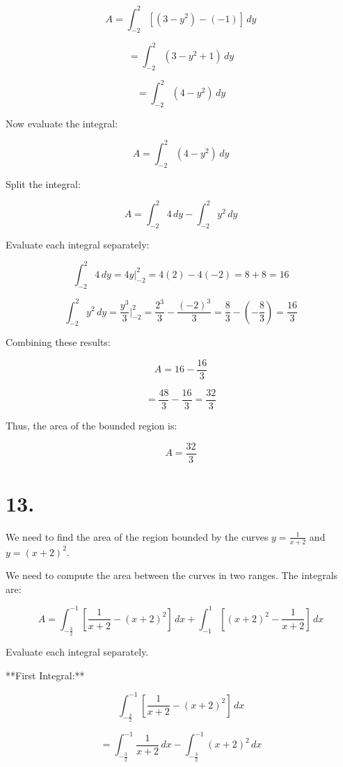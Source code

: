 \documentclass{article}
\begin{document}
\[
A = \int_{-2}^{2} \left[ (3 - y^2) - (-1) \right] \, dy
\]

\[
= \int_{-2}^{2} \left( 3 - y^2 + 1 \right) \, dy
\]

\[
= \int_{-2}^{2} \left( 4 - y^2 \right) \, dy
\]



Now evaluate the integral:

\[
A = \int_{-2}^{2} \left( 4 - y^2 \right) \, dy
\]

Split the integral:

\[
A = \int_{-2}^{2} 4 \, dy - \int_{-2}^{2} y^2 \, dy
\]

Evaluate each integral separately:

\[
\int_{-2}^{2} 4 \, dy = 4y \Big|_{-2}^{2} = 4(2) - 4(-2) = 8 + 8 = 16
\]

\[
\int_{-2}^{2} y^2 \, dy = \frac{y^3}{3} \Big|_{-2}^{2} = \frac{2^3}{3} - \frac{(-2)^3}{3} = \frac{8}{3} - \left(-\frac{8}{3}\right) = \frac{16}{3}
\]

Combining these results:

\[
A = 16 - \frac{16}{3}
\]

\[
= \frac{48}{3} - \frac{16}{3} = \frac{32}{3}
\]

Thus, the area of the bounded region is:

\[
A = \frac{32}{3}
\]

\section*{13.}

We need to find the area of the region bounded by the curves \( y = \frac{1}{x + 2} \) and \( y = (x + 2)^2 \). 





We need to compute the area between the curves in two ranges. The integrals are:

\[
A = \int_{-\frac{3}{2}}^{-1} \left[ \frac{1}{x + 2} - (x + 2)^2 \right] \, dx + \int_{-1}^{1} \left[ (x + 2)^2 - \frac{1}{x + 2} \right] \, dx
\]



Evaluate each integral separately.

**First Integral:**

\[
\int_{-\frac{3}{2}}^{-1} \left[ \frac{1}{x + 2} - (x + 2)^2 \right] \, dx
\]

\[
= \int_{-\frac{3}{2}}^{-1} \frac{1}{x + 2} \, dx - \int_{-\frac{3}{2}}^{-1} (x + 2)^2 \, dx
\]
\end{document}
